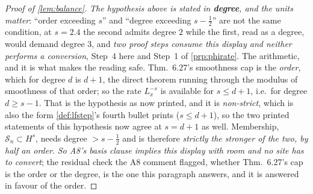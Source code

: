 \begin{proof}[Proof of \cref{lem:balance}]
\emph{The hypothesis above is stated in \textbf{degree}, and the units matter}: ``order exceeding $s$''
and ``degree exceeding $s-\tfrac12$'' are not the same condition, at $s=2.4$ the second admits degree
$2$ while the first, read as a degree, would demand degree $3$, and \emph{two proof steps consume this
display and neither performs a conversion}, Step~4 here and Step~1 of \cref{prp:phirate}.
The arithmetic, and it is what makes the reading safe. Thm.~6.27's smoothness cap is the
\emph{order}, which for degree $d$ is $d+1$, the direct theorem running through the modulus of smoothness
of that order; so the rate $L_x^{-s}$ is available for $s\le d+1$, i.e.\ for degree $d\ge s-1$. That is the
hypothesis as now printed, and it is \emph{non-strict}, which is also the form \cref{def:lfstep}'s fourth
bullet prints ($s\le d+1$), so the two
printed statements of this hypothesis now agree at $s=d+1$ as well. Membership,
$\mathcal S_n\subset H^{s}$, needs degree $>s-\tfrac12$ and is therefore \emph{strictly the stronger of the
two, by half an order}. \emph{So A8's basis clause implies this display with room and no site
has to convert}; the residual check the A8 comment flagged, whether Thm.~6.27's cap is the
order or the degree, is the one this paragraph answers, and it is answered in favour of the order.


\end{proof}

